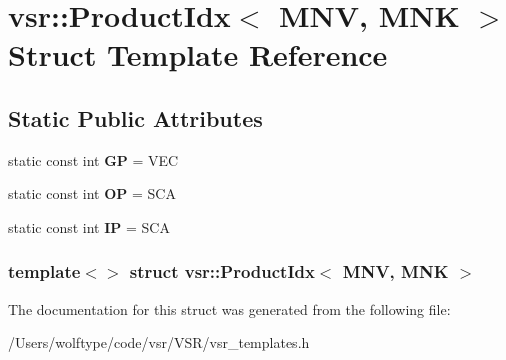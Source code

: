 \hypertarget{structvsr_1_1_product_idx_3_01_m_n_v_00_01_m_n_k_01_4}{\section{vsr\-:\-:Product\-Idx$<$ M\-N\-V, M\-N\-K $>$ Struct Template Reference}
\label{structvsr_1_1_product_idx_3_01_m_n_v_00_01_m_n_k_01_4}
}
\subsection*{Static Public Attributes}
\begin{DoxyCompactItemize}
\item 
\hypertarget{structvsr_1_1_product_idx_3_01_m_n_v_00_01_m_n_k_01_4_a8bac81ca762982eea44974febca24377}{static const int {\bfseries G\-P} = V\-E\-C}\label{structvsr_1_1_product_idx_3_01_m_n_v_00_01_m_n_k_01_4_a8bac81ca762982eea44974febca24377}

\item 
\hypertarget{structvsr_1_1_product_idx_3_01_m_n_v_00_01_m_n_k_01_4_a141441192bd846df66476fc49b845679}{static const int {\bfseries O\-P} = S\-C\-A}\label{structvsr_1_1_product_idx_3_01_m_n_v_00_01_m_n_k_01_4_a141441192bd846df66476fc49b845679}

\item 
\hypertarget{structvsr_1_1_product_idx_3_01_m_n_v_00_01_m_n_k_01_4_af1d0d6795b792ef9b91b2a6f1fb56448}{static const int {\bfseries I\-P} = S\-C\-A}\label{structvsr_1_1_product_idx_3_01_m_n_v_00_01_m_n_k_01_4_af1d0d6795b792ef9b91b2a6f1fb56448}

\end{DoxyCompactItemize}
\subsubsection*{template$<$$>$ struct vsr\-::\-Product\-Idx$<$ M\-N\-V, M\-N\-K $>$}



The documentation for this struct was generated from the following file\-:\begin{DoxyCompactItemize}
\item 
/\-Users/wolftype/code/vsr/\-V\-S\-R/vsr\-\_\-templates.\-h\end{DoxyCompactItemize}
